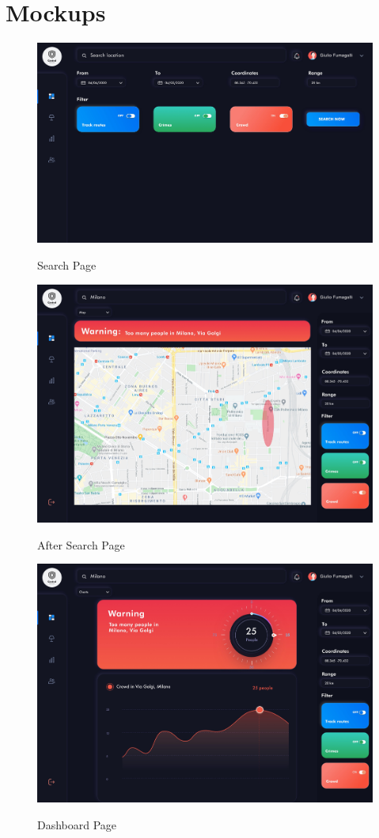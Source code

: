 \documentclass[../main.tex]{subfiles}
\begin{document}
    \section{Mockups}
    \begin{figure}[H]
        \centering
        \includegraphics[scale = 0.6]{assets/mockups/mock_search.png}\\
        \caption[]{Search Page}\label{fig:figure}
    \end{figure}
    \begin{figure}[H]
        \centering
        \includegraphics[scale = 0.6]{assets/mockups/mock_aftersearch.png}\\
        \caption[]{After Search Page}\label{fig:figure2}
    \end{figure}
    \newpage
    \begin{figure}[H]
        \centering
        \includegraphics[scale = 0.6]{assets/mockups/mock_dash.png}\\
        \caption[]{Dashboard Page}\label{fig:figure3}
    \end{figure}
\end{document}
